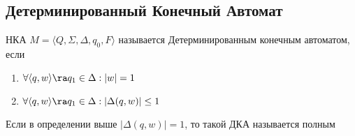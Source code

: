 
\subsection{Детерминированный Конечный Автомат}
\begin{definition}
    НКА \(M = \langle Q, \Sigma, \Delta, q_0, F\rangle\) называется Детерминированным конечным автоматом, если
    \begin{enumerate}
        \item \(\forall \langle q, w\rangle \ra q_1 \in \Delta: |w| = 1\)
        \item \(\forall \langle q, w\rangle \ra q_1 \in \Delta: |\Delta(q, w)| \le 1\)
    \end{enumerate}
\end{definition}

\begin{definition}
    Если в определении выше \(|\Delta(q, w)| = 1\), то такой ДКА называется полным
\end{definition}

